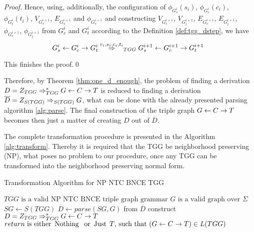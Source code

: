 \documentclass[]{report}
\begin{document}
\begin{proof}
	Hence, using, additionally, the configuration of $\phi_{G^i_s}(s_i)$, $\phi_{G^i_c}(c_i)$, $\phi_{G^i_t}(t_i)$, $V_{G^{i+1}_s}$, $E_{G^{i+1}_s}$ and $\phi_{G^{i+1}_s}$ and constructing $V_{G^{i+1}_c}$, $V_{G^{i+1}_t}$, $E_{G^{i+1}_c}$, $E_{G^{i+1}_t}$, $\phi_{G^{i+1}_c}$, $\phi_{G^{i+1}_t}$ from $G^i_c$ and $G^i_t$ according to the Definition \ref{def:tgg_dstep}, we have 
	\begin{equation*}
		G^i_s \ms{} G^i_c \mt{} G^i_t \tderiv{r_i}{s_i,c_i,t_i}{TGG} G^{i+1}_s \ms{} G^{i+1}_c \mt{} G^{i+1}_t
	\end{equation*}
	
	This finishes the proof.\qed
\end{proof}

Therefore, by Theorem \ref{thm:one_d_enough}, the problem of finding a derivation $D = Z_{TGG} \Rightarrow^*_{TGG} G \overset{}{\leftarrow} C \overset{}{\rightarrow} T$ is reduced to finding a derivation $\overline{D} = \startG{S(TGG)} \deriv{}{}{S(TGG)} G$, what can be done with the already presented parsing algorithm \ref{alg:parse}. The final construction of the triple graph $G \overset{}{\leftarrow} C \overset{}{\rightarrow} T$ becomes then just a matter of creating $D$ out of $\overline{D}$.


The complete transformation procedure is presented in the Algorithm \ref{alg:transform}. Thereby it is required that the TGG be neighborhood preserving (NP), what poses no problem to our procedure, once any TGG can be transformed into the neighborhood preserving normal form. 


\begin{algorithm}[!h]
	\caption{Transformation Algorithm for NP NTC BNCE TGG}
	\begin{algorithmic}[!ht]
		\Require $TGG \text{ is a valid NP NTC BNCE triple graph grammar}$
		\Require $G \text{ is a valid graph over } \Sigma$
		\State $SG \gets S(TGG)$ 
		\State $\overline{D} \gets parse(SG,G)$ 
		 
		\State from $\overline{D}$ construct $D = Z_{TGG} \Rightarrow^*_{TGG} G \overset{}{\leftarrow} C \overset{}{\rightarrow} T$
		\State {}
		\Else
		\State \Return {$\Nothing$} 
		\EndIf
		\EndFunction 
		\Ensure $return \text{ is either } \operatorname{\text{Nothing}}\; \text{ or } \operatorname{\text{Just}}\; T \text{, such that } (G \overset{}{\leftarrow} C \overset{}{\rightarrow} T) \in L(TGG)$
	\end{algorithmic}
	\label{alg:transform}
\end{algorithm}
\end{document}
